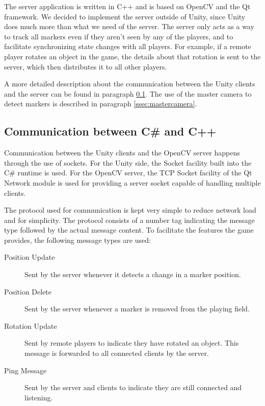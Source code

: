         The server application is written in C++ and is based on OpenCV and the 
        Qt framework. We decided to implement the server outside of Unity, since 
        Unity does much more than what we need of the server. The server only 
        acts as a way to track all markers even if they aren't seen by any of 
        the players, and to facilitate synchronizing state changes with all 
        players. For example, if a remote player rotates an object in the game, 
        the details about that rotation is sent to the server, which then 
        distributes it to all other players.
        
        A more detailed description about the communication between the Unity 
        clients and the server can be found in paragraph \ref{ssec:communication}.
        The use of the master camera to detect markers is described in paragraph
        \ref{ssec:mastercamera}.
                
        \subsection{Communication between C\# and C++} \label{ssec:communication}
            Communication between the Unity clients and the OpenCV server 
            happens through the use of sockets. For the Unity side, the Socket 
            facility built into the C\# runtime is used. For the OpenCV server, 
            the TCP Socket facility of the Qt Network module is used for 
            providing a server socket capable of handling multiple clients. 
            
            The protocol used for communication is kept very simple to reduce 
            network load and for simplicity. The protocol consists of a number
            tag indicating the message type followed by the actual message 
            content. To facilitate the features the game provides, the following
            message types are used:
            
            \begin{description}
                \item[Position Update] Sent by the server whenever it detects a 
                                       change in a marker position.
                \item[Position Delete] Sent by the server whenever a marker is
                                       removed from the playing field.
                \item[Rotation Update] Sent by remote players to indicate they 
                                       have rotated an object. This message is 
                                       forwarded to all connected clients by the
                                       server.
                \item[Ping Message]    Sent by the server and clients to indicate 
                                       they are still connected and listening.
            \end{description}
        
